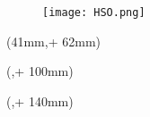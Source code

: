 \titlehead{\hsmatyp\ in\  \hsmastudienganglang}
\subject{}
\title{\hsmatitel}
\author{\hsmaauthor}
\date{\small{\hsmadatum}}


\newlength{\bindekorrektur}
\newlength{\seitenanfang}
\newlength{\seitenbreite}
  
\setlength{\bindekorrektur}{-46mm}   %
\setlength{\seitenanfang}{0mm}       %
\setlength{\seitenbreite}{297mm}

\captionsetup[figure]{labelformat=empty}
\noindent 
\begin{figure}[H]
	\texttt{[image: HSO.png]}
\end{figure}
\captionsetup[figure]{labelformat=simple}


\begin{textblock*}{128mm}(41mm,\seitenanfang + 62mm) %
  \centering\Large\sffamily
  \vspace{12mm} %
  \textbf{\hsmatitel}
\end{textblock*}%

\begin{textblock*}{\seitenbreite}(\bindekorrektur,\seitenanfang + 100mm)
  \centering\large\sffamily
  \hsmaautor
\end{textblock*}

\begin{textblock*}{\seitenbreite}(\bindekorrektur,\seitenanfang + 140mm)
  \centering\large\sffamily
  \textbf{\hsmatyp}\\
  \vspace{6mm}
  \hsmastudiengangname
\end{textblock*}

